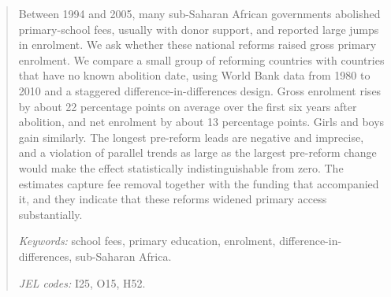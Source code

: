 \begin{abstract}
Between 1994 and 2005, many sub-Saharan African governments abolished primary-school fees, usually with donor support, and reported large jumps in enrolment. We ask whether these national reforms raised gross primary enrolment. We compare a small group of reforming countries with countries that have no known abolition date, using World Bank data from 1980 to 2010 and a staggered difference-in-differences design. Gross enrolment rises by about 22 percentage points on average over the first six years after abolition,
and net enrolment by about 13 percentage points.
Girls and boys gain similarly. The longest pre-reform leads are negative and imprecise, and a violation of parallel trends as large as the largest pre-reform change would make the effect statistically indistinguishable from zero. The estimates capture fee removal together with the funding that accompanied it, and they indicate that these reforms widened primary access substantially.

\medskip
\noindent\textit{Keywords:} school fees, primary education, enrolment, difference-in-differences, sub-Saharan Africa.

\noindent\textit{JEL codes:} I25, O15, H52.
\end{abstract}
